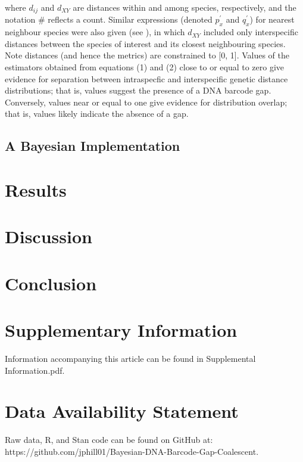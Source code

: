 \documentclass[12pt]{article}
\begin{document}
\noindent where $d_{ij}$ and $d_{XY}$ are distances within and among species, respectively, and the notation \# reflects a count. Similar expressions (denoted $p^{'}_x$ and $q^{'}_x$) for nearest neighbour species were also given (see \cite{phillips2024measure}), in which $d_{XY}$ included only interspecific distances between the species of interest and its closest neighbouring species. Note distances (and hence the metrics) are constrained to [0, 1].  Values of the estimators obtained from equations (1) and (2) close to or equal to zero give evidence for separation between intraspecfic and interspecific genetic distance distributions; that is, values suggest the presence of a DNA barcode gap. Conversely, values near or equal to one give evidence for distribution overlap; that is, values likely indicate the absence of a gap.



\subsection{A Bayesian Implementation}


\section{Results}

\section{Discussion}

\section{Conclusion}


\newpage

\section*{Supplementary Information}

Information accompanying this article can be found in Supplemental Information.pdf.

\section*{Data Availability Statement}

Raw data, R, and Stan code can be found on GitHub at: \\ https://github.com/jphill01/Bayesian-DNA-Barcode-Gap-Coalescent.
\end{document}
